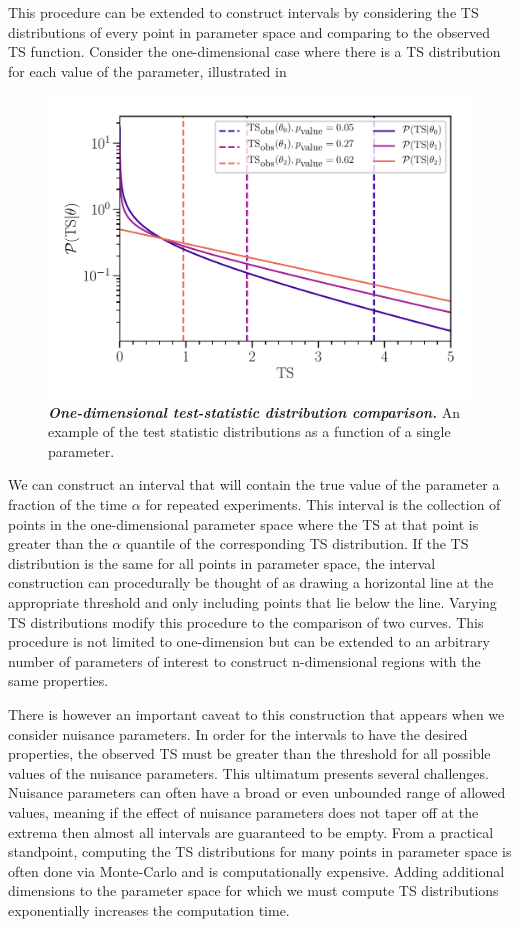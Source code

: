 This procedure can be extended to construct intervals by considering the TS distributions of every point in parameter space and comparing to the observed TS function.
Consider the one-dimensional case where there is a TS distribution for each value of the parameter, illustrated in~
\begin{figure}
	\centering
	\includegraphics[width=0.8\linewidth]{figures/TS_dists_1d}
	\caption{\textbf{\textit{One-dimensional test-statistic distribution comparison.}} An example of the test statistic distributions as a function of a single parameter.
	}
	\label{fig:TS_dists_1d}
\end{figure}
We can construct an interval that will contain the true value of the parameter a fraction of the time $\alpha$ for repeated experiments.
This interval is the collection of points in the one-dimensional parameter space where the TS at that point is greater than the $\alpha$ quantile of the corresponding TS distribution.
If the TS distribution is the same for all points in parameter space, the interval construction can procedurally be thought of as drawing a horizontal line at the appropriate threshold and only including points that lie below the line.
Varying TS distributions modify this procedure to the comparison of two curves.
This procedure is not limited to one-dimension but can be extended to an arbitrary number of parameters of interest to construct n-dimensional regions with the same properties.

There is however an important caveat to this construction that appears when we consider nuisance parameters.
In order for the intervals to have the desired properties, the observed TS must be greater than the threshold for all possible values of the nuisance parameters.
This ultimatum presents several challenges.
Nuisance parameters can often have a broad or even unbounded range of allowed values, meaning if the effect of nuisance parameters does not taper off at the extrema then almost all intervals are guaranteed to be empty.
From a practical standpoint, computing the TS distributions for many points in parameter space is often done via Monte-Carlo and is computationally expensive.
Adding additional dimensions to the parameter space for which we must compute TS distributions exponentially increases the computation time.

